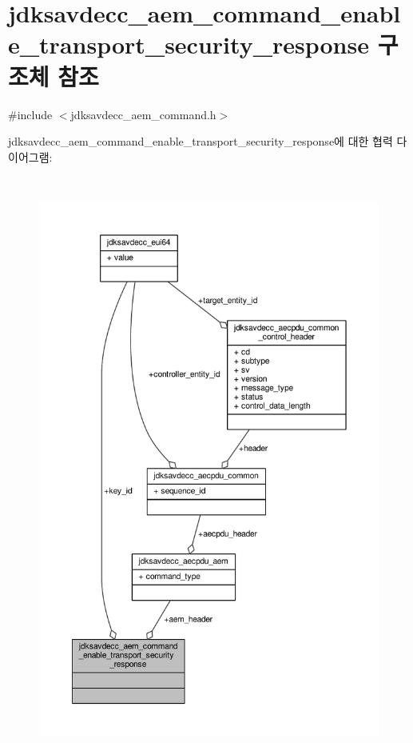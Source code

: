 \hypertarget{structjdksavdecc__aem__command__enable__transport__security__response}{}\section{jdksavdecc\+\_\+aem\+\_\+command\+\_\+enable\+\_\+transport\+\_\+security\+\_\+response 구조체 참조}
\label{structjdksavdecc__aem__command__enable__transport__security__response}


{\ttfamily \#include $<$jdksavdecc\+\_\+aem\+\_\+command.\+h$>$}



jdksavdecc\+\_\+aem\+\_\+command\+\_\+enable\+\_\+transport\+\_\+security\+\_\+response에 대한 협력 다이어그램\+:
\nopagebreak
\begin{figure}[H]
\begin{center}
\leavevmode
\includegraphics[height=550pt]{structjdksavdecc__aem__command__enable__transport__security__response__coll__graph}
\end{center}
\end{figure}
